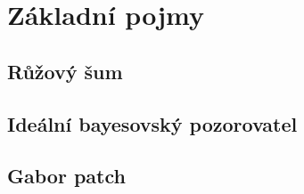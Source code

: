\chapter{Základní pojmy}

\section{Růžový šum}

\section{Ideální bayesovský pozorovatel}

\section{Gabor patch}
\citet{náhodná citace}
